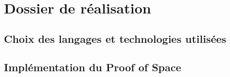 \documentclass[../tb_report.tex]{subfiles}
\begin{document}
\chapter{Dossier de réalisation}
\label{ch:realisation}

\section{Choix des langages et technologies utilisées}

\section{Implémentation du Proof of Space}
\end{document}
